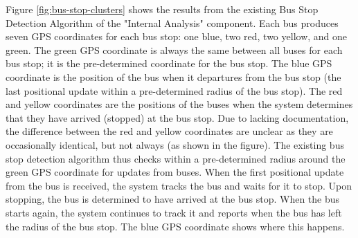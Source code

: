 Figure \ref{fig:bus-stop-clusters} shows the results from the existing Bus Stop Detection Algorithm of the "Internal Analysis" component.
Each bus produces seven GPS coordinates for each bus stop: one blue, two red, two yellow, and one green.
The green GPS coordinate is always the same between all buses for each bus stop; it is the pre-determined coordinate for the bus stop.
The blue GPS coordinate is the position of the bus when it departures from the bus stop (the last positional update within a pre-determined radius of the bus stop).
The red and yellow coordinates are the positions of the buses when the system determines that they have arrived (stopped) at the bus stop.
Due to lacking documentation, the difference between the red and yellow coordinates are unclear as they are occasionally identical, but not always (as shown in the figure).
The existing bus stop detection algorithm thus checks within a pre-determined radius around the green GPS coordinate for updates from buses.
When the first positional update from the bus is received, the system tracks the bus and waits for it to stop.
Upon stopping, the bus is determined to have arrived at the bus stop.
When the bus starts again, the system continues to track it and reports when the bus has left the radius of the bus stop.
The blue GPS coordinate shows where this happens. 